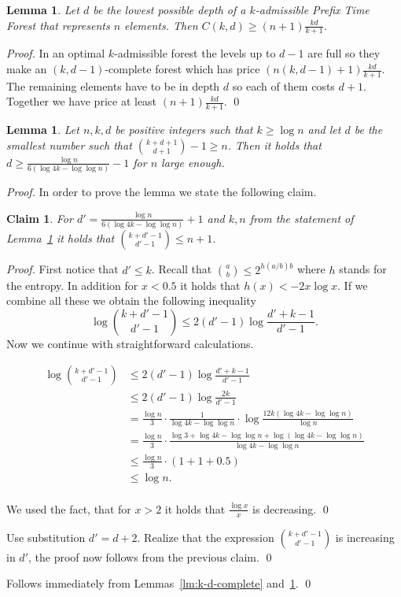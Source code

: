 \documentclass{llncs}
\newtheorem{lemma}[definition]{Lemma}
\newtheorem{claim}[definition]{Claim}
\newenvironment{proofof}[1]{\noindent{\it Proof of #1. }} {{\qed}}
\newcommand{\optPrice}[2]{C\left(#1, #2\right)}
\begin{document}
\begin{lemma}
\label{lm:bucketing-price-bound-by-depth}
Let $d$ be the lowest possible depth of a $k$-admissible Prefix Time Forest that represents $n$ elements.
Then $\optPrice kd \ge (n+1) \frac{k d}{k+1}$.
\end{lemma}
\begin{proof}
In an optimal $k$-admissible forest the levels up to $d-1$ are full
so they make an $(k,d-1)$-complete forest which has price
$(n(k,d-1)+1) \frac{k d}{k+1}$. The remaining elements
have to be in depth $d$ so each of them costs $d+1$. Together we
have price at least $(n+1) \frac{k d}{k+1}$.
\qed
\end{proof}

\begin{lemma}
\label{lm:lower_bound_d} Let $n, k, d$ be positive integers such that $k\ge \log n$ and let $d$ be the smallest number such that ${k+d+1 \choose d+1} - 1\ge n$. Then it holds that $d\ge \frac{\log n}{6 (\log 4k - \log \log n)} - 1$ for $n$ large enough.
\end{lemma}
\begin{proof}
In order to prove the lemma we state the following claim.
\newcommand{\ddd}{d'}
\begin{claim}
\label{cl:d_value}
For $\ddd = \frac{\log n}{6 (\log 4k - \log \log n)} + 1$ and $k, n$ from the statement of Lemma~\ref{lm:lower_bound_d} it holds that ${k+\ddd-1 \choose \ddd-1} \leq n + 1$.
\end{claim}
\begin{proof}
First notice that $\ddd\leq k$. Recall that ${a \choose b}\leq 2^{h(a/b)b}$ where $h$ stands for the entropy.
In addition for $x<0.5$ it holds that $h(x)<- 2x \log x$. If we combine all these we obtain the following
inequality $$\log {k + \ddd - 1 \choose \ddd - 1} \leq 2(\ddd - 1) \log\frac{\ddd + k - 1}{\ddd - 1}.$$ Now we continue
with straightforward calculations.

\[
\begin{split}
\log {k + \ddd - 1 \choose \ddd - 1}
	& \leq 2(\ddd - 1) \log\frac{\ddd + k - 1}{\ddd - 1} \\
	& \leq 2(\ddd - 1) \log\frac{2k}{\ddd - 1} \\
	& = \frac{\log n}{3} \cdot \frac{1}{\log 4k - \log \log n} \cdot \log \frac{12k (\log 4k - \log \log n)}{\log n} \\
	& = \frac{\log n}{3} \cdot \frac{\log 3 + \log 4k - \log \log n + \log (\log 4k - \log \log n)}{\log 4k - \log \log n} \\
	& \leq \frac{\log n}{3} \cdot (1 + 1 + 0.5) \\
	& \leq \log n.\\
\end{split}
\]

We used the fact, that for $x > 2$ it holds that $\frac{\log x}{x}$ is decreasing.
\qed
\end{proof}

Use substitution $d' = d + 2$.
Realize that the expression ${k + \ddd - 1 \choose \ddd - 1}$ is increasing in $\ddd$, the proof now follows from the previous claim.
\qed
\end{proof}

\begin{proofof}{Theorem~\ref{thm:bucketing-lower-bound}}
Follows immediately from Lemmas~\ref{lm:k-d-complete} and~\ref{lm:lower_bound_d}.
\end{proofof}



\end{document}
